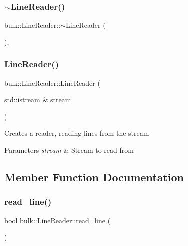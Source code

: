 \subsubsection{\texorpdfstring{$\sim$\+Line\+Reader()}{~LineReader()}}
{\footnotesize\ttfamily bulk\+::\+Line\+Reader\+::$\sim$\+Line\+Reader (\begin{DoxyParamCaption}{ }\end{DoxyParamCaption})\hspace{0.3cm}{\ttfamily [override]}, {\ttfamily [default]}}

\mbox{\label{classbulk_1_1LineReader_aba7481f117f2155880d3e6b8e069633b}} 
\subsubsection{\texorpdfstring{Line\+Reader()}{LineReader()}}
{\footnotesize\ttfamily bulk\+::\+Line\+Reader\+::\+Line\+Reader (\begin{DoxyParamCaption}\item[{std\+::istream \&}]{stream }\end{DoxyParamCaption})\hspace{0.3cm}{\ttfamily [explicit]}}

Creates a reader, reading lines from the stream 
\begin{DoxyParams}{Parameters}
{\em stream} & Stream to read from \\
\hline
\end{DoxyParams}


\subsection{Member Function Documentation}
\mbox{\label{classbulk_1_1LineReader_a8d0d6a11d162f9e020eed84e563a585f}} 
\subsubsection{\texorpdfstring{read\+\_\+line()}{read\_line()}}
{\footnotesize\ttfamily bool bulk\+::\+Line\+Reader\+::read\+\_\+line (\begin{DoxyParamCaption}{ }\end{DoxyParamCaption})}

